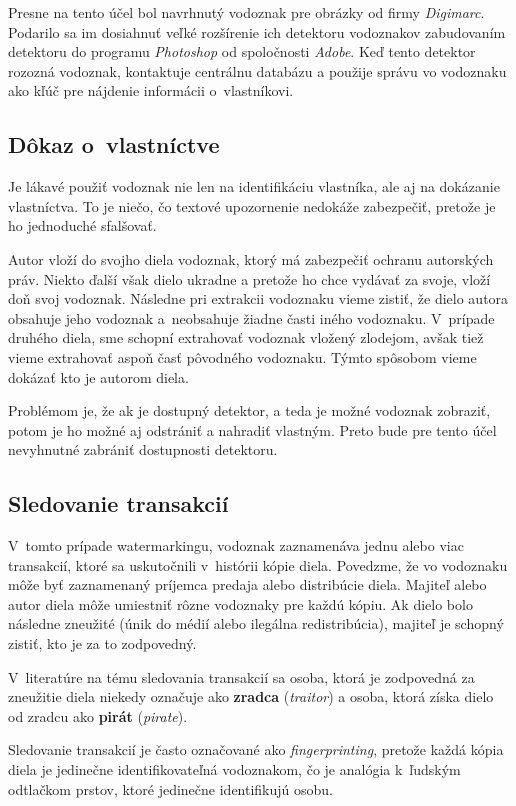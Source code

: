 Presne na tento účel bol navrhnutý vodoznak pre obrázky od firmy {\it Digimarc}. Podarilo sa im dosiahnuť veľké rozšírenie ich detektoru vodoznakov zabudovaním detektoru do programu {\it Photoshop} od spoločnosti {\it Adobe}. Keď tento detektor rozozná vodoznak, kontaktuje centrálnu databázu a použije správu vo vodoznaku ako kľúč pre nájdenie informácii o~vlastníkovi. \cite{Cox}

\subsection{Dôkaz o~vlastníctve}
Je lákavé použiť vodoznak nie len na identifikáciu vlastníka, ale aj na dokázanie vlastníctva. To je niečo, čo textové upozornenie nedokáže zabezpečiť, pretože je ho jednoduché sfalšovať.

Autor vloží do svojho diela vodoznak, ktorý má zabezpečiť ochranu autorských práv. Niekto ďalší však dielo ukradne a pretože ho chce vydávať za svoje, vloží doň svoj vodoznak. Následne pri extrakcii vodoznaku vieme zistiť, že dielo autora obsahuje jeho vodoznak a~neobsahuje žiadne časti iného vodoznaku. V~prípade druhého diela, sme schopní extrahovať vodoznak vložený zlodejom, avšak tiež vieme extrahovať aspoň časť pôvodného vodoznaku. Týmto spôsobom vieme dokázať kto je autorom diela.

Problémom je, že ak je dostupný detektor, a teda je možné vodoznak zobraziť, potom je ho možné aj odstrániť a nahradiť vlastným. Preto bude pre tento účel nevyhnutné zabrániť dostupnosti detektoru. \cite{Cox}

\subsection{Sledovanie transakcií}
V~tomto prípade watermarkingu, vodoznak zaznamenáva jednu alebo viac transakcií, ktoré sa uskutočnili v~histórii kópie diela. Povedzme, že vo vodoznaku môže byť zaznamenaný príjemca predaja alebo distribúcie diela. Majiteľ alebo autor diela môže umiestniť rôzne vodoznaky pre každú kópiu. Ak dielo bolo následne zneužité (únik do médií alebo ilegálna redistribúcia), majiteľ je schopný zistiť, kto je za to zodpovedný.

V~literatúre na tému sledovania transakcií sa osoba, ktorá je zodpovedná za zneužitie diela niekedy označuje ako {\bf zradca} ({\it traitor}) a osoba, ktorá získa dielo od zradcu ako {\bf pirát} ({\it pirate}).

Sledovanie transakcií je často označované ako {\it fingerprinting}, pretože každá kópia diela je jedinečne identifikovateľná vodoznakom, čo je analógia k~ľudským odtlačkom prstov, ktoré jedinečne identifikujú osobu.

